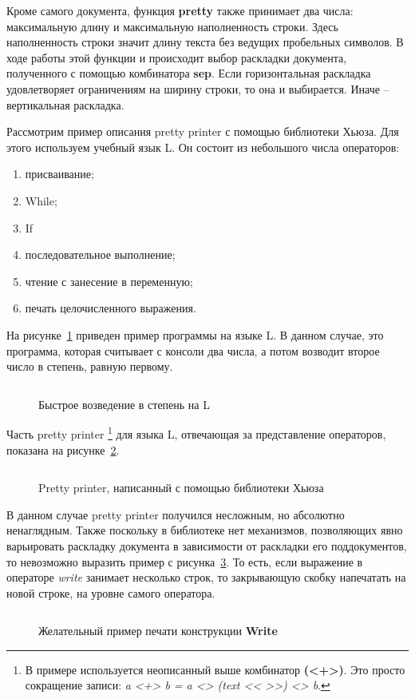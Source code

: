 \inputminted{haskell}{codes/hughesPretty.hs}

Кроме самого документа, функция \textbf{pretty} также принимает два числа: максимальную длину и максимальную наполненность строки. Здесь наполненность строки значит длину текста без ведущих пробельных символов. В ходе работы этой функции и происходит выбор раскладки документа, полученного с помощью комбинатора \textbf{sep}. Если горизонтальная раскладка удовлетворяет ограничениям на ширину строки, то она и выбирается. Иначе -- вертикальная раскладка.



Рассмотрим пример описания pretty printer с помощью библиотеки Хьюза. Для этого используем учебный язык L. Он состоит из небольшого числа операторов:
\begin{enumerate}
\item присваивание;
\item While;
\item If
\item последовательное выполнение;
\item чтение с занесение в переменную;
\item печать целочисленного выражения.
\end{enumerate}

На рисунке~\ref{fig:lEx} приведен пример программы на языке L. В данном случае, это программа, которая считывает с консоли два числа, а потом возводит второе число в степень, равную первому.

\begin{figure}[h!]
	\centering
	\inputminted{pascal}{codes/lEx.l}
	\caption{Быстрое возведение в степень на L}
	\label{fig:lEx}
\end{figure}

Часть pretty printer
\footnote{В примере используется неописанный выше комбинатор \textbf{(<+>)}. Это просто сокращение записи: \textit{a <+> b = a <> (text << >>) <> b}. }
для языка L, отвечающая за представление операторов, показана на рисунке~\ref{fig:lHughesPrinter}.
\begin{figure}[h!]
	\inputminted{haskell}{codes/lHughesPrinter.hs}
	\caption{Pretty printer, написанный с помощью библиотеки Хьюза}
	\label{fig:lHughesPrinter}
\end{figure}

В данном случае pretty printer получился несложным, но абсолютно ненаглядным. Также поскольку в библиотеке нет механизмов, позволяющих явно варьировать раскладку документа в зависимости от раскладки его поддокументов, то невозможно выразить пример с рисунка~\ref{fig:lGoodWriteEx}. То есть, если выражение в операторе \textit{write} занимает несколько строк, то закрывающую скобку напечатать на новой строке, на уровне самого оператора.
\begin{figure}[h!]
	\inputminted{pascal}{codes/lGoodWriteEx.l}
	\caption{Желательный пример печати конструкции \textbf{Write}}
	\label{fig:lGoodWriteEx}
\end{figure}

